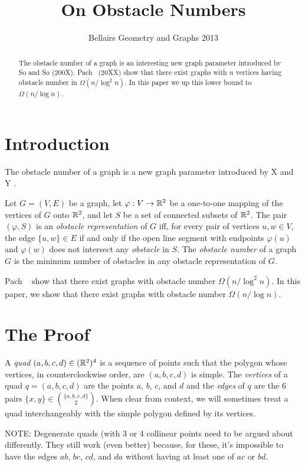 \documentclass{patmorin}
\title{On Obstacle Numbers}
\author{Bellairs Geometry and Graphs 2013}
\begin{document}
\maketitle

\begin{abstract}
The obstacle number of a graph is an interesting new graph parameter
introduced by So and So (200X).  Pach \etal\ (20XX) show that there
exist graphs with $n$ vertices having obstacle number in $\Omega(n/\log^2
n)$. In this paper we up this lower bound to $\Omega(n/\log n)$.
\end{abstract}

\section{Introduction}

The obstacle number of a graph is a new graph parameter introduced by
X and Y \cite{xy}.

Let $G=(V,E)$ be a graph, let $\varphi:V\to \mathbb{R}^2$ be a one-to-one
mapping of the vertices of $G$ onto $\mathbb{R}^2$, and let $S$ be a set of
connected subsets of $\mathbb{R}^2$.  The pair $(\varphi,S)$ is an \emph{obstacle
representation} of $G$ iff, for every pair of vertices $u,w\in V$, the
edge $\{u,w\}\in E$ if and only if the open line segment with endpoints
$\varphi(u)$ and $\varphi(w)$ does not intersect any \emph{obstacle}
in $S$.  The \emph{obstacle number} of a graph $G$ is the minimum number
of obstacles in any obstacle representation of $G$.

Pach \etal\ \cite{paXX} show that there exist graphs with obstacle
number $\Omega(n/\log^2 n)$.  In this paper, we show that there exist
graphs with obstacle number $\Omega(n/\log n)$.

\section{The Proof}

A \emph{quad} $(a,b,c,d)\in(\mathbb{R}^2)^4$ is a sequence of points such that
the polygon whose vertices, in counterclockwise order, are $(a,b,c,d)$
is simple.  The \emph{vertices} of a quad $q=(a,b,c,d)$ are the points
$a$, $b$, $c$, and $d$ and the \emph{edges} of $q$ are the 6 pairs
$\{x,y\}\in\binom{\{a,b,c,d\}}{2}$.  When clear from context, we will
sometimes treat a quad interchangeably with the simple polygon defined
by its vertices.

NOTE: Degenerate quads (with 3 or 4 collinear points need to be argued
about differently.  They still work (even better) because, for these,
it's impossible to have the edges $ab$, $bc$, $cd$, and $da$ without
having at least one of $ac$ or $bd$.
\end{document}
